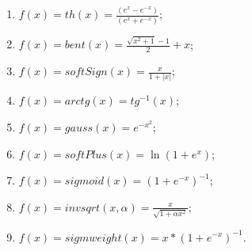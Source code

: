 \documentclass[]{article}
\makeatletter
\newcommand{\xslalph}[1]{\expandafter\@xslalph\csname c@#1\endcsname}
\newcommand{\@xslalph}[1]{%
    \ifcase#1\or а\or б\or в\or г\or д\or e\or є\or ж\or з\or i%
    \or й\or к\or л\or м\or н\or о\or п\or р\or с\or т%
    \or у\or ф\or х\or ц\or ч\or ш\or ю\or я\or аа\or бб\or вв %
    \else\@ctrerr\fi%
}
\makeatother
\begin{document}
\begin{enumerate}
  \begin{enumerate}[label=\xslalph*)]
  \item   \(f(x) = th(x) = \frac{(e^{x} - e^{-x})}{(e^{x} + e^{-x})}\);
\item \(f(x) = bent(x) = \frac{\sqrt{x^{2} + 1} - 1}{2} + x\);
\item \(f(x) = softSign(x) = \frac{x}{1 + |x|}\);
\item \(f(x) = arctg(x) = tg^{-1}(x)\);
\item\(f(x) = gauss(x) = e^{-x^{2}}\);
\item \(f(x) = softPlus(x) = \ln(1 + e^{x})\);
\item \(f(x) = sigmoid(x) = {(1 + e^{-x})}^{-1}\);
\item \(f(x) = invsqrt(x,\alpha) = \frac{x}{\sqrt{1 + \alpha x^{2}}}\);
\item\(f(x) = sigmweight(x) = x*{(1 + e^{-x})}^{-1}\).

 \end{enumerate}
\end{enumerate}
\end{document}
